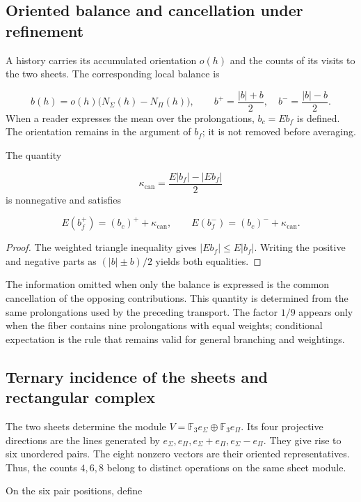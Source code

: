 \subsection{Oriented balance and cancellation under refinement}
A history carries its accumulated orientation \(o(h)\) and the counts of its visits to the two sheets. The corresponding local balance is

\[
b(h)=o(h)\bigl(N_\Sigma(h)-N_\Pi(h)\bigr),
\qquad
b^+=\frac{|b|+b}{2},\quad b^-=\frac{|b|-b}{2}.
\]
When a reader expresses the mean over the prolongations, \(b_c=Eb_f\) is defined. The orientation remains in the argument of \(b_f\); it is not removed before averaging.

\begin{proposition}
\label{prop:continuo-defecto-cancelacion}
The quantity

\[
\kappa_{\mathrm{can}}=
\frac{E|b_f|-|Eb_f|}{2}
\]
is nonnegative and satisfies

\[
E(b_f^+)=(b_c)^++\kappa_{\mathrm{can}},
\qquad
E(b_f^-)=(b_c)^-+\kappa_{\mathrm{can}}.
\]
\end{proposition}
\begin{proof}
The weighted triangle inequality gives \(|Eb_f|\leq E|b_f|\). Writing the positive and negative parts as \((|b|\pm b)/2\) yields both equalities.
\end{proof}

The information omitted when only the balance is expressed is the common cancellation of the opposing contributions. This quantity is determined from the same prolongations used by the preceding transport. The factor \(1/9\) appears only when the fiber contains nine prolongations with equal weights; conditional expectation is the rule that remains valid for general branching and weightings.

\subsection{Ternary incidence of the sheets and rectangular complex}
The two sheets determine the module \(V=\mathbb F_3e_\Sigma\oplus\mathbb F_3e_\Pi\). Its four projective directions are the lines generated by \(e_\Sigma,e_\Pi,e_\Sigma+e_\Pi,e_\Sigma-e_\Pi\). They give rise to six unordered pairs. The eight nonzero vectors are their oriented representatives. Thus, the counts \(4,6,8\) belong to distinct operations on the same sheet module.

On the six pair positions, define

